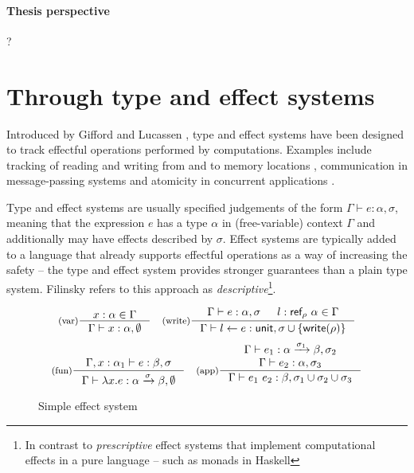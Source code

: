 \paragraph{Thesis perspective}
?

\newpage

\section{Through type and effect systems}
\label{sec:path-eff}

Introduced by Gifford and Lucassen \cite{effects-gifford,effects-polymorphic}, type and effect 
systems have been designed to track effectful operations performed by computations. Examples 
include tracking of reading and writing from and to memory locations \cite{effects-talpin-et-al}, 
communication in message-passing systems \cite{effects-messagepassing} and atomicity in concurrent 
applications \cite{effects-atomicity}.

Type and effect systems are usually specified judgements of the form $\Gamma \vdash e : \alpha, \sigma$, 
meaning that the expression $e$ has a type $\alpha$ in (free-variable) context $\Gamma$ and 
additionally may have effects described by $\sigma$. Effect systems are typically added to a 
language that already supports effectful operations as a way of increasing the safety -- the type
and effect system provides stronger guarantees than a plain type system. Filinsky 
\cite{effects-comprehensive} refers to this approach as \emph{descriptive}\footnote{In contrast
to \emph{prescriptive} effect systems that implement computational effects in a pure language 
-- such as monads in Haskell}.


\begin{figure}[t]
\begin{equation*}
\inference[(var)]
  {x:\alpha \in \Gamma }
  {\Gamma \vdash x : \alpha, \emptyset }
\quad
\inference[(write)]
  {\Gamma \vdash e : \alpha, \sigma & l:\ident{ref}_\rho~\alpha\in \Gamma}
  {\Gamma \vdash l \leftarrow e : \ident{unit}, \sigma \cup \{\ident{write}(\rho)\} }
\end{equation*}
\begin{equation*}
\inference[(fun)]
  {\Gamma, x:\alpha_1 \vdash e : \beta, \sigma }
  {\Gamma \vdash \lambda x.e : \alpha \xrightarrow{\sigma} \beta, \emptyset }
\quad  
\inference[(app)]
  {\Gamma \vdash e_1 : \alpha \xrightarrow{\sigma_1} \beta, \sigma_2 \\
   \Gamma \vdash e_2 : \alpha, \sigma_3 }
  {\Gamma \vdash e_1~e_2 : \beta, \sigma_1 \cup \sigma_2 \cup \sigma_3 }
\end{equation*}

\caption{Simple effect system}
\label{fig:path-eff}
\end{figure}

